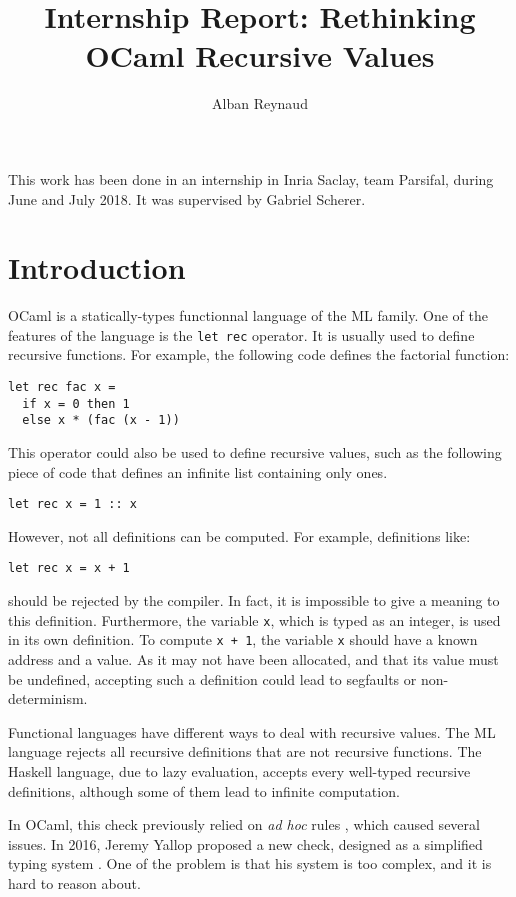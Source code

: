 \documentclass{article}
\title{Internship Report: Rethinking OCaml Recursive Values}
\author{Alban Reynaud}
\date{}
\begin{document}
\maketitle

This work has been done in an internship in Inria Saclay, team Parsifal, during
June and July 2018. It was supervised by Gabriel Scherer.

\section{Introduction}
OCaml is a statically-types functionnal language of the ML family. One of the
features of the language is the \lstinline|let rec| operator. It is usually
used to define recursive functions. For example, the following code defines the
factorial function:

\begin{lstlisting}
let rec fac x =
  if x = 0 then 1
  else x * (fac (x - 1))
\end{lstlisting}

This operator could also be used to define recursive values, such as the
following piece of code that defines an infinite list containing only ones.
\begin{lstlisting}
let rec x = 1 :: x
\end{lstlisting}

However, not all definitions can be computed. For example, definitions like:
\begin{lstlisting}
let rec x = x + 1
\end{lstlisting}
should be rejected by the compiler. In fact, it is impossible to give a meaning
to this definition. Furthermore, the variable \lstinline|x|, which is typed as
an integer, is used in its own definition. To compute \lstinline|x + 1|, the
variable \lstinline|x| should have a known address and a value. As it may not
have been allocated, and that its value must be undefined, accepting such a
definition could lead to segfaults or non-determinism.

Functional languages have different ways to deal with recursive values. The
ML language rejects all recursive definitions that are not recursive functions.
The Haskell language, due to lazy evaluation, accepts every well-typed recursive
definitions, although some of them lead to infinite computation.

In OCaml, this check previously relied on \textit{ad hoc} rules
\cite{PreviousRules}, which caused several issues. In 2016, Jeremy Yallop
proposed a new check, designed as a simplified typing system \cite{Yallop}.
One of the problem is that his system is too complex, and it is hard to reason
about.
\end{document}
